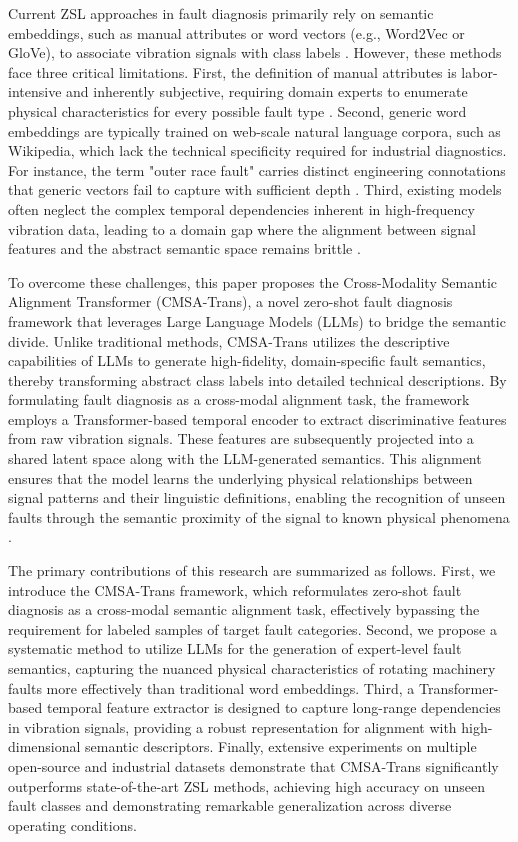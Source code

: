 \documentclass[journal]{IEEEtran}
\begin{document}
Current ZSL approaches in fault diagnosis primarily rely on semantic embeddings, such as manual attributes or word vectors (e.g., Word2Vec or GloVe), to associate vibration signals with class labels \cite{lampert2014attribute}. However, these methods face three critical limitations. First, the definition of manual attributes is labor-intensive and inherently subjective, requiring domain experts to enumerate physical characteristics for every possible fault type \cite{fu2018zero}. Second, generic word embeddings are typically trained on web-scale natural language corpora, such as Wikipedia, which lack the technical specificity required for industrial diagnostics. For instance, the term "outer race fault" carries distinct engineering connotations that generic vectors fail to capture with sufficient depth \cite{mikolov2013efficient}. Third, existing models often neglect the complex temporal dependencies inherent in high-frequency vibration data, leading to a domain gap where the alignment between signal features and the abstract semantic space remains brittle \cite{xian2018zero, buchert2020zero}.

To overcome these challenges, this paper proposes the Cross-Modality Semantic Alignment Transformer (CMSA-Trans), a novel zero-shot fault diagnosis framework that leverages Large Language Models (LLMs) to bridge the semantic divide. Unlike traditional methods, CMSA-Trans utilizes the descriptive capabilities of LLMs to generate high-fidelity, domain-specific fault semantics, thereby transforming abstract class labels into detailed technical descriptions. By formulating fault diagnosis as a cross-modal alignment task, the framework employs a Transformer-based temporal encoder to extract discriminative features from raw vibration signals. These features are subsequently projected into a shared latent space along with the LLM-generated semantics. This alignment ensures that the model learns the underlying physical relationships between signal patterns and their linguistic definitions, enabling the recognition of unseen faults through the semantic proximity of the signal to known physical phenomena \cite{vaswani2017attention, radford2021learning}.

The primary contributions of this research are summarized as follows. First, we introduce the CMSA-Trans framework, which reformulates zero-shot fault diagnosis as a cross-modal semantic alignment task, effectively bypassing the requirement for labeled samples of target fault categories. Second, we propose a systematic method to utilize LLMs for the generation of expert-level fault semantics, capturing the nuanced physical characteristics of rotating machinery faults more effectively than traditional word embeddings. Third, a Transformer-based temporal feature extractor is designed to capture long-range dependencies in vibration signals, providing a robust representation for alignment with high-dimensional semantic descriptors. Finally, extensive experiments on multiple open-source and industrial datasets demonstrate that CMSA-Trans significantly outperforms state-of-the-art ZSL methods, achieving high accuracy on unseen fault classes and demonstrating remarkable generalization across diverse operating conditions.
\end{document}
